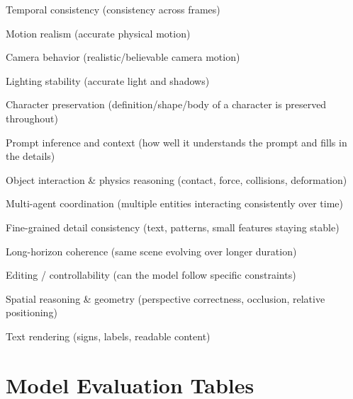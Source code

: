 \documentclass[sigconf]{acmart}
\begin{document}
\begin{enumerate}[label=\textbf{[\arabic*]}, leftmargin=*]

    \item \label{param:1}Temporal consistency (consistency across frames)

    \item \label{param:2}Motion realism (accurate physical motion)

    \item \label{param:3}Camera behavior (realistic/believable camera motion)

    \item \label{param:4}Lighting stability (accurate light and shadows)

    \item \label{param:5}Character preservation (definition/shape/body of a character is preserved throughout)

    \item \label{param:6}Prompt inference and context (how well it understands the prompt and fills in the details)

    \item \label{param:7}Object interaction \& physics reasoning (contact, force, collisions, deformation)

    \item \label{param:8}Multi-agent coordination (multiple entities interacting consistently over time)

    \item \label{param:9}Fine-grained detail consistency (text, patterns, small features staying stable)

    \item \label{param:10}Long-horizon coherence (same scene evolving over longer duration)

    \item \label{param:11}Editing / controllability (can the model follow specific constraints)

    \item \label{param:12}Spatial reasoning \& geometry (perspective correctness, occlusion, relative positioning)

    \item \label{param:13}Text rendering (signs, labels, readable content)

\end{enumerate}


\onecolumn
\section{Model Evaluation Tables}
\label{app:eval_tables}
\end{document}
